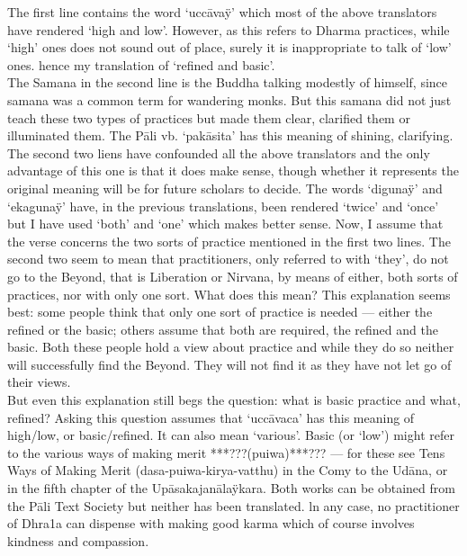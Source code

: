 The first line contains the word `ucc\=ava\"y' which most of the above translators have rendered `high and low'. However, as this refers to Dharma practices, while `high' ones does not sound out of place, surely it is inappropriate to talk of `low' ones. hence my translation of `refined and basic'.\\

The Samana in the second line is the Buddha talking modestly of himself, since samana was a common term for wandering monks. But this samana did not just teach these two types of practices but made them clear, clarified them or illuminated them. The P\=ali vb. `pak\=asita' has this meaning of shining, clarifying.\\

The second two liens have confounded all the above translators and the only advantage of this one is that it does make sense, though whether it represents the original meaning will be for future scholars to decide. The words `diguna\"y' and `ekaguna\"y' have, in the previous translations, been rendered `twice' and `once' but I have used `both' and `one' which makes better sense. Now, I assume that the verse concerns the two sorts of practice mentioned in the first two lines. The second two seem to mean that practitioners, only referred to with `they', do not go to the Beyond, that is Liberation or Nirvana, by means of either, both sorts of practices, nor with only one sort. What does this mean? This explanation seems best: some people think that only one sort of practice is needed — either the refined or the basic; others assume that both are required, the refined and the basic. Both these people hold a view about practice and while they do so neither will successfully find the Beyond. They will not find it as they have not let go of their views.\\

But even this explanation still begs the question: what is basic practice and what, refined? Asking this question assumes that `ucc\=avaca' has this meaning of high/low, or basic/refined. It can also mean `various'. Basic (or `low') might refer to the various ways of making merit ***???(puiwa)***??? — for these see Tens Ways of Making Merit (dasa-puiwa-kirya-vatthu) in the Comy to the Ud\=ana, or in the ﬁfth chapter of the Up\=asakajan\=ala\"ykara. Both works can be obtained from the P\=ali Text Society but neither has been translated. ln any case, no practitioner of Dhra1a can dispense with making good karma which of course involves kindness and compassion.\\

